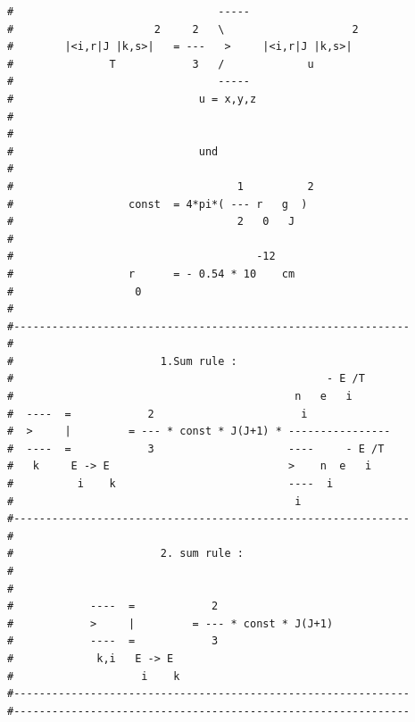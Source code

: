 \begin{enumerate}
{\begin{verbatim}
#                                -----                         
#                      2     2   \                    2        
#        |<i,r|J |k,s>|   = ---   >     |<i,r|J |k,s>|         
#               T            3   /             u               
#                                -----                         
#                             u = x,y,z                        
#                                                              
#                                                              
#                             und                              
#                                                              
#                                   1          2               
#                  const  = 4*pi*( --- r   g  )                
#                                   2   0   J                  
#                                                              
#                                      -12                     
#                  r      = - 0.54 * 10    cm                  
#                   0                                          
#                                                              
#--------------------------------------------------------------
#                                                              
#                       1.Sum rule :                           
#                                                 - E /T       
#                                            n   e   i         
#  ----  =            2                       i                
#  >     |         = --- * const * J(J+1) * ----------------   
#  ----  =            3                     ----     - E /T    
#   k     E -> E                            >    n  e   i      
#          i    k                           ----  i            
#                                            i                 
#--------------------------------------------------------------
#                                                              
#                       2. sum rule :                          
#                                                              
#                                                              
#            ----  =            2                              
#            >     |         = --- * const * J(J+1)            
#            ----  =            3                              
#             k,i   E -> E                                     
#                    i    k                                    
#-------------------------------------------------------------- 
#-------------------------------------------------------------- 

\end{verbatim}}
\end{enumerate}
